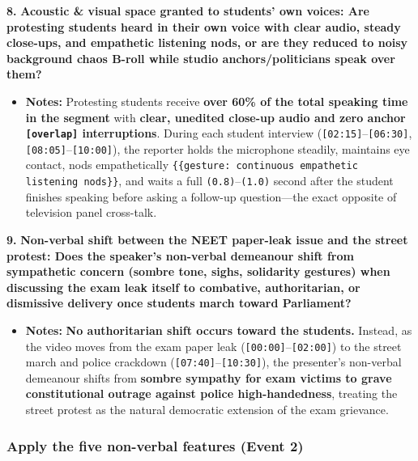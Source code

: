 \documentclass[10pt,a4paper]{article}
\begin{document}
\noindent\textbf{8.} \textbf{Acoustic \& visual space granted to students' own voices: Are protesting students heard in their own voice with clear audio, steady close-ups, and empathetic listening nods, or are they reduced to noisy background chaos B-roll while studio anchors/politicians speak over them?}\par\smallskip
\begin{itemize}
  \item \textbf{Notes:}
Protesting students receive \textbf{over 60\% of the total speaking time in the segment} with \textbf{clear, unedited close-up audio and zero anchor \texttt{[overlap]} interruptions}. During each student interview (\texttt{[02:15]}--\texttt{[06:30]}, \texttt{[08:05]}--\texttt{[10:00]}), the reporter holds the microphone steadily, maintains eye contact, nods empathetically \texttt{\{\{gesture: continuous empathetic listening nods\}\}}, and waits a full \texttt{(0.8)}--\texttt{(1.0)} second after the student finishes speaking before asking a follow-up question---the exact opposite of television panel cross-talk.\par\smallskip
\end{itemize}

\noindent\textbf{9.} \textbf{Non-verbal shift between the NEET paper-leak issue and the street protest: Does the speaker's non-verbal demeanour shift from sympathetic concern (sombre tone, sighs, solidarity gestures) when discussing the exam leak itself to combative, authoritarian, or dismissive delivery once students march toward Parliament?}\par\smallskip
\begin{itemize}
  \item \textbf{Notes:}
\textbf{No authoritarian shift occurs toward the students.} Instead, as the video moves from the exam paper leak (\texttt{[00:00]}--\texttt{[02:00]}) to the street march and police crackdown (\texttt{[07:40]}--\texttt{[10:30]}), the presenter's non-verbal demeanour shifts from \textbf{sombre sympathy for exam victims to grave constitutional outrage against police high-handedness}, treating the street protest as the natural democratic extension of the exam grievance.\par\smallskip
\end{itemize}

\subsubsection*{Apply the five non-verbal features (Event 2)}
\end{document}
